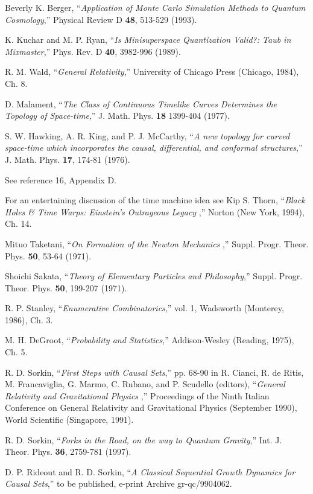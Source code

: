 \documentclass[aps,amssymb,12pt]{revtex4-2}
\begin{document}
\begin{references}
  Beverly K. Berger, ``{\it Application of Monte Carlo
Simulation Methods to Quantum Cosmology},'' Physical Review D {\bf 48},
513-529 (1993).

  K. Kuchar and M. P. Ryan, ``{\it Is Minisuperspace
Quantization Valid?: Taub in Mixmaster},'' Phys. Rev. D {\bf 40}, 3982-996
(1989).

  R. M. Wald, ``{\it General Relativity},'' University of
Chicago Press (Chicago, 1984), Ch. 8.

  D. Malament, ``{\it The Class of Continuous Timelike Curves
Determines the Topology of Space-time},'' J. Math. Phys. {\bf 18} 1399-404
(1977).

  S. W. Hawking, A. R. King, and P. J. McCarthy, ``{\it A new
topology for curved space-time which incorporates the causal, differential,
and conformal structures},'' J. Math. Phys. {\bf 17}, 174-81 (1976).

  See reference 16, Appendix D.

  For an entertaining discussion of the time machine idea see
Kip S. Thorn, ``{\it Black Holes \& Time Warps: Einstein's Outrageous Legacy}%
,'' Norton (New York, 1994), Ch. 14.

  Mituo Taketani, ``{\it On Formation of the Newton Mechanics}%
,'' Suppl. Progr. Theor. Phys. {\bf 50}, 53-64 (1971).

  Shoichi Sakata, ``{\it Theory of Elementary Particles and
Philosophy},'' Suppl. Progr. Theor. Phys. {\bf 50}, 199-207 (1971).

  R. P. Stanley, ``{\it Enumerative Combinatorics},'' vol. 1,
Wadsworth (Monterey, 1986), Ch. 3.

  M. H. DeGroot, ``{\it Probability and Statistics},''
Addison-Wesley (Reading, 1975), Ch. 5.

  R. D. Sorkin, ``{\it First Steps with Causal Sets},'' pp.
68-90 in R. Cianci, R. de Ritis, M. Francaviglia, G. Marmo, C. Rubano, and
P. Scudello (editors), ``{\it General Relativity and Gravitational Physics}%
,'' Proceedings of the Ninth Italian Conference on General Relativity and
Gravitational Physics (September 1990), World Scientific (Singapore, 1991).

  R. D. Sorkin, ``{\it Forks in the Road, on the way to Quantum
Gravity},'' Int. J. Theor. Phys. {\bf 36}, 2759-781 (1997).

  D. P. Rideout and R. D. Sorkin, ``{\it A Classical Sequential
Growth Dynamics for Causal Sets},'' to be published, e-print Archive
gr-qc/9904062.


\end{references}
\end{document}
